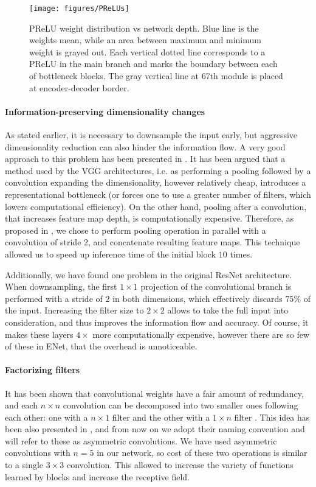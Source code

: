 \documentclass{article}
\begin{document}
\begin{figure}[!t]
  \centering
  \texttt{[image: figures/PReLUs]}
  \caption{
    PReLU weight distribution vs network depth.
    Blue line is the weights mean, while an area between maximum and minimum weight is grayed out.
    Each vertical dotted line corresponds to a PReLU in the main branch and marks the boundary between each of bottleneck blocks.
    The gray vertical line at 67th module is placed at encoder-decoder border.
  }
  \vspace{0.05in}
  \label{fig:PReLU}
\end{figure}

\paragraph{Information-preserving dimensionality changes}
As stated earlier, it is necessary to downsample the input early, but aggressive dimensionality reduction can also hinder the information flow.
A very good approach to this problem has been presented in \cite{szegedy2015rethinking}.
It has been argued that a method used by the VGG architectures, i.e. as performing a pooling followed by a convolution expanding the dimensionality, however relatively cheap, introduces a representational bottleneck (or forces one to use a greater number of filters, which lowers computational efficiency).
On the other hand, pooling after a convolution, that increases feature map depth, is computationally expensive.
Therefore, as proposed in \cite{szegedy2015rethinking}, we chose to perform pooling operation in parallel with a convolution of stride 2, and concatenate resulting feature maps. This technique allowed us to speed up inference time of the initial block $10$ times.

Additionally, we have found one problem in the original ResNet architecture.
When downsampling, the first $1 \times 1$ projection of the convolutional branch is performed with a stride of $2$ in both dimensions, which effectively discards $75\%$ of the input.
Increasing the filter size to $2 \times 2$ allows to take the full input into consideration, and thus improves the information flow and accuracy.
Of course, it makes these layers $4 \times$ more computationally expensive, however there are so few of these in ENet, that the overhead is unnoticeable.

\paragraph{Factorizing filters}
It has been shown that convolutional weights have a fair amount of redundancy, and each $n \times n$ convolution can be decomposed into two smaller ones following each other: one with a $n \times 1$ filter and the other with a $1 \times n$ filter \cite{jin2014flattened}.
This idea has been also presented in \cite{szegedy2015rethinking}, and from now on we adopt their naming convention and will refer to these as asymmetric convolutions.
We have used asymmetric convolutions with $n = 5$ in our network, so cost of these two operations is similar to a single $3 \times 3$ convolution.
This allowed to increase the variety of functions learned by blocks and increase the receptive field.
\end{document}
